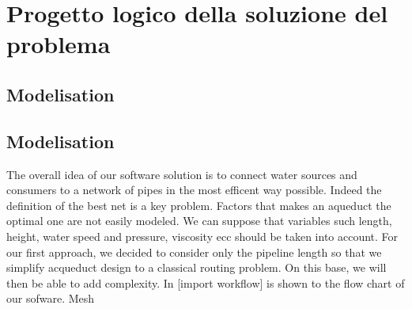 \chapter{Progetto logico della soluzione del problema}
\label{capitolo4}
\thispagestyle{empty}

\section {Modelisation}

\section {Modelisation}
The overall idea of our software solution is to connect water sources and consumers to a network of pipes in the most efficent way possible. Indeed the definition of the best net is a key problem. Factors that makes an aqueduct the optimal one are not easily modeled. We can suppose that variables such length, height, water speed and pressure, viscosity ecc should be taken into account.
\hfill For our first approach, we decided to consider only the pipeline length so that we simplify acqueduct design to a classical routing problem. On this base, we will then be able to add complexity.
\bigbreak
In [import workflow] is shown to the flow chart of our sofware. Mesh 


